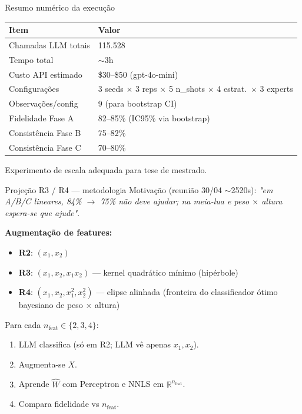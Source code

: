 \documentclass[aspectratio=169,10pt]{beamer}
\begin{document}
\begin{frame}{Resumo num\'erico da execu\c{c}\~ao}
  \footnotesize
  \begin{center}
  \begin{tabular}{ll}
    \toprule
    \textbf{Item} & \textbf{Valor} \\
    \midrule
    Chamadas LLM totais & 115.528 \\
    Tempo total & $\sim$3h \\
    Custo API estimado & \$30--\$50 (gpt-4o-mini) \\
    Configura\c{c}\~oes & 3 seeds $\times$ 3 reps $\times$ 5 n\_shots $\times$ 4 estrat.\ $\times$ 3 experts \\
    Observa\c{c}\~oes/config & 9 (para bootstrap CI) \\
    Fidelidade Fase A & 82--85\% (IC95\% via bootstrap) \\
    Consist\^encia Fase B & 75--82\% \\
    Consist\^encia Fase C & 70--80\% \\
    \bottomrule
  \end{tabular}
  \end{center}
  Experimento de escala adequada para tese de mestrado.
\end{frame}


\begin{frame}{Proje\c{c}\~ao R3 / R4 --- metodologia}
  \scriptsize
  Motiva\c{c}\~ao (reuni\~ao 30/04 $\sim$2520s): \emph{"em A/B/C lineares, 84\% $\to$ 75\% n\~ao deve ajudar; na meia-lua e peso $\times$ altura espera-se que ajude"}.
  \medskip

  \textbf{Augmenta\c{c}\~ao de features:}
  \begin{itemize}
    \item \textbf{R2}: $(x_1, x_2)$
    \item \textbf{R3}: $(x_1, x_2, x_1 x_2)$ --- kernel quadr\'atico m\'inimo (hip\'erbole)
    \item \textbf{R4}: $(x_1, x_2, x_1^2, x_2^2)$ --- elipse alinhada (fronteira do classificador \'otimo bayesiano de peso $\times$ altura)
  \end{itemize}
  \medskip

  Para cada $n_{\text{feat}} \in \{2,3,4\}$:
  \begin{enumerate}\setlength\itemsep{0.05em}
    \item LLM classifica (s\'o em R2; LLM v\^e apenas $x_1, x_2$).
    \item Augmenta-se $X$.
    \item Aprende $\hat W$ com Perceptron e NNLS em $\mathbb{R}^{n_{\text{feat}}}$.
    \item Compara fidelidade vs $n_{\text{feat}}$.
  \end{enumerate}
\end{frame}
\end{document}
